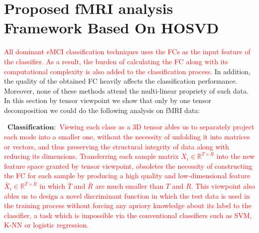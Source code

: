 \documentclass[preprint,12pt]{elsarticle}
\begin{document}
	
	
	
\section{Proposed fMRI analysis Framework Based On HOSVD}

\textcolor{red}{All dominant eMCI classification techniques uses the FCs as the input feature of the classifier. As a result, the burden of calculating the FC along with its computational complexity is also added to the classification process.} 
In addition, the quality of the obtained FC heavily affects the  classification performance. Moreover, none of these methods  attend  the multi-linear propriety of such data.
In this section by tensor viewpoint we show that only by one tensor decomposition we could do the following analysis on fMRI data:

\textbullet\ $\mathbf{Classification:}$
\textcolor{red}{
	Viewing each class as a 3D tensor ables us to separately project each mode into a smaller one, without the necessity of unfolding it into matrices or vectors, and thus preserving the structural integrity of data along with reducing its dimensions. Transferring each sample matrix $X_i\in \mathbb{R}^{T \times R}$ into the new feature space granted by tensor viewpoint, obsoletes the necessity of constructing the FC for each sample by producing a high quality and low-dimensional feature $\bar{X}_i \in \mathbb{R}^{\bar{T} \times \bar{R}}$ in which $\bar{T}$ and $\bar{R}$ are much smaller than $T$ and $R$. This viewpoint also ables us to design a novel discriminant function in which the test data is used in the training process without forcing any apriory knowledge about its label to the classifier, a task which is impossible via the conventional classifiers such as SVM, K-NN or logistic regression.  
}



%	
\end{document}
